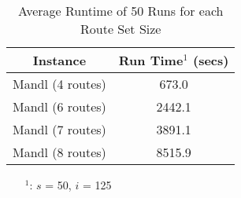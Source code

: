\begin{table}[H]
    \centering
    \hspace*{-1.0cm}
    \begin{tabular}{|c|c|}
        \hline
        \textbf{Instance} & \textbf{Run Time$^1$ (secs)}\\
        \hline
        Mandl (4 routes) & 673.0\\
        \hline
        Mandl (6 routes) & 2442.1\\
        \hline
        Mandl (7 routes) & 3891.1\\
        \hline
        Mandl (8 routes) & 8515.9\\
        \hline
    \end{tabular}
    \caption{Average Runtime of 50 Runs for each Route Set Size}
    \begin{itemize}[noitemsep]
    \item[$^1$:] $s$ = 50, $i$ = 125
    \end{itemize} 
    \label{tabel:runTimeMandl}
\end{table}